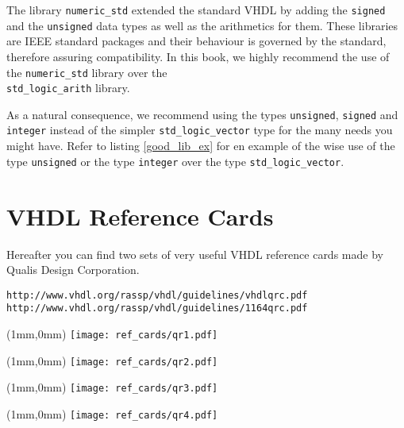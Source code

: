 The library \texttt{numeric\_std} extended the standard VHDL by adding the \texttt{signed} and the \texttt{unsigned} data types as well as the arithmetics for them. These libraries are IEEE standard packages and their behaviour is governed by the standard, therefore assuring compatibility. In this book, we highly recommend the use of the \texttt{numeric\_std} library over the\\ \texttt{std\_logic\_arith} library.

As a natural consequence, we recommend using the types \texttt{unsigned}, \texttt{signed} and \texttt{integer} instead of the simpler \texttt{std\_logic\_vector} type for the many needs you might have. Refer to listing \ref{good_lib_ex} for en example of the wise use of the type \texttt{unsigned} or the type \texttt{integer} over the type \texttt{std\_logic\_vector}.

\chapter{VHDL Reference Cards}
Hereafter you can find two sets of very useful VHDL reference cards made by Qualis Design Corporation.

\noindent
\begin{verbatim}
http://www.vhdl.org/rassp/vhdl/guidelines/vhdlqrc.pdf
http://www.vhdl.org/rassp/vhdl/guidelines/1164qrc.pdf
\end{verbatim}

\newpage\clearpage
\thispagestyle{empty}
\begin{textblock*}{148mm}(1mm,0mm)
\texttt{[image: ref\_cards/qr1.pdf]}
\end{textblock*}
\null\newpage

\thispagestyle{empty}
\begin{textblock*}{148mm}(1mm,0mm)
\texttt{[image: ref\_cards/qr2.pdf]}
\end{textblock*}
\null\newpage

\thispagestyle{empty}
\begin{textblock*}{148mm}(1mm,0mm)
\texttt{[image: ref\_cards/qr3.pdf]}
\end{textblock*}
\null\newpage

\thispagestyle{empty}
\begin{textblock*}{148mm}(1mm,0mm)
\texttt{[image: ref\_cards/qr4.pdf]}
\end{textblock*}
\null\newpage

